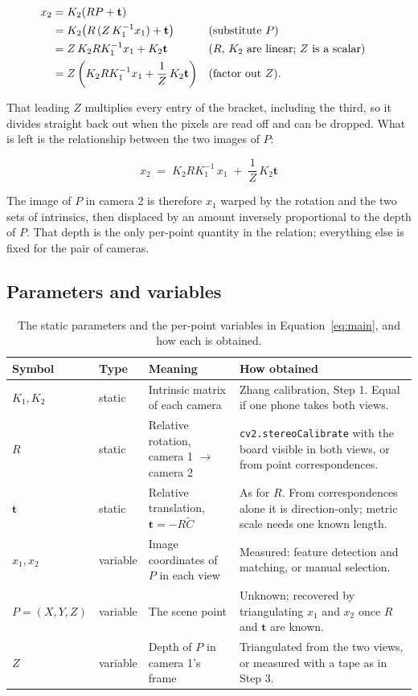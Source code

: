 \documentclass[11pt,a4paper]{article}
\begin{document}
\begin{align}
x_2 &= K_2 (R P + \mathbf{t}) \notag \\
    &= K_2 \bigl( R \,(Z\,K_1^{-1} x_1) + \mathbf{t} \bigr)
       &&\text{(substitute $P$)} \notag \\
    &= Z\,K_2 R K_1^{-1} x_1 + K_2 \mathbf{t}
       &&\text{($R$, $K_2$ are linear; $Z$ is a scalar)} \notag \\
    &= Z \left( K_2 R K_1^{-1} x_1 + \frac{1}{Z}\,K_2 \mathbf{t} \right)
       &&\text{(factor out $Z$).}
\label{eq:chain}
\end{align}

That leading $Z$ multiplies every entry of the bracket, including the third, so
it divides straight back out when the pixels are read off and can be dropped.
What is left is the relationship between the two images of $P$:

\begin{equation}
\boxed{\;
x_2 \;=\; K_2 R K_1^{-1}\, x_1 \;+\; \frac{1}{Z}\,K_2 \mathbf{t} \;}
\label{eq:main}
\end{equation}

The image of $P$ in camera 2 is therefore $x_1$ warped by the rotation and the
two sets of intrinsics, then displaced by an amount inversely proportional to
the depth of $P$. That depth is the only per-point quantity in the relation;
everything else is fixed for the pair of cameras.

\subsection{Parameters and variables}

\begin{table}[H]
\caption{The static parameters and the per-point variables in
Equation~\eqref{eq:main}, and how each is obtained.}
\label{tab:params}
\small
\begin{tabularx}{\textwidth}{@{}llLL@{}}
\toprule
Symbol & Type & Meaning & How obtained \\
\midrule
$K_1, K_2$ & static & Intrinsic matrix of each camera & Zhang calibration,
Step 1. Equal if one phone takes both views. \\
$R$ & static & Relative rotation, camera 1 $\to$ camera 2 &
\texttt{cv2.stereoCalibrate} with the board visible in both views, or from
point correspondences. \\
$\mathbf{t}$ & static & Relative translation, $\mathbf{t} = -R\tilde{C}$ & As
for $R$. From correspondences alone it is direction-only; metric scale needs
one known length. \\
$x_1, x_2$ & variable & Image coordinates of $P$ in each view & Measured:
feature detection and matching, or manual selection. \\
$P = (X,Y,Z)$ & variable & The scene point & Unknown; recovered by
triangulating $x_1$ and $x_2$ once $R$ and $\mathbf{t}$ are known. \\
$Z$ & variable & Depth of $P$ in camera 1's frame & Triangulated from the two
views, or measured with a tape as in Step 3. \\
\bottomrule
\end{tabularx}
\end{table}
\end{document}
